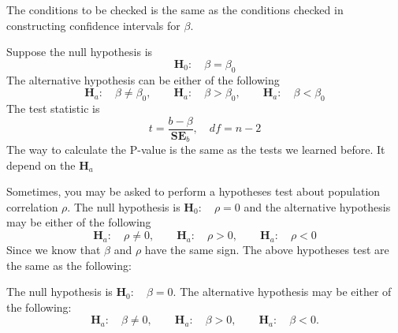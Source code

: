 \documentclass[a4paper, 12pt,twoside]{book}
\begin{document}
\begin{itemize}
    The conditions to be checked is the same as the conditions checked in constructing confidence intervals for $\beta$. \vspace{0.3cm}
    
    Suppose the null hypothesis is 
    $$\textbf{H}_0:\quad \beta = \beta_0$$
    The alternative hypothesis can be either of the following
    $$\textbf{H}_a:\quad \beta \ne \beta_0, 
    \qquad \textbf{H}_a:\quad \beta > \beta_0,
     \qquad \textbf{H}_a:\quad \beta < \beta_0$$
    The test statistic is 
     $$\displaystyle{t=\frac{b-\beta}{\textbf{SE}_b}}, \quad df = n-2$$
     The way to calculate the P-value is the same as the tests we learned before. It depend on the $\textbf{H}_a$\vspace{0.3cm}
     
     \colorbox{babypink}{\parbox{\textwidth}{
     Sometimes, you may be asked to perform a hypotheses test about population correlation $\rho$. The null hypothesis is $\textbf{H}_0:\quad \rho = 0$ and the alternative hypothesis may be either of the following
        $$\textbf{H}_a:\quad \rho \ne 0, 
    \qquad \textbf{H}_a:\quad \rho > 0,
     \qquad \textbf{H}_a:\quad \rho < 0$$
     Since we know that $\beta$ and $\rho$ have the same sign. The above hypotheses test are the same as the following:\vspace{0.3cm}
     
     The null hypothesis is $\textbf{H}_0:\quad \beta =0$. The alternative hypothesis may be either of the following:
             $$\textbf{H}_a:\quad \beta \ne 0, 
    \qquad \textbf{H}_a:\quad \beta > 0,
     \qquad \textbf{H}_a:\quad \beta < 0.$$
     }}
 \end{itemize}
\newpage
\end{document}
